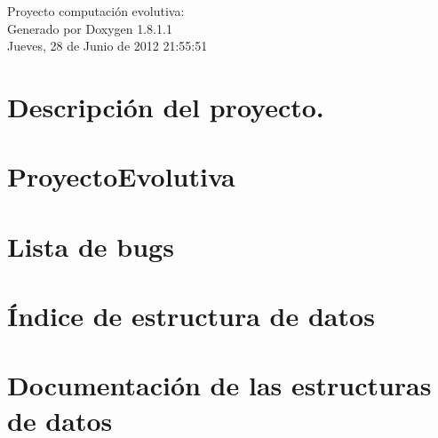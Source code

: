 \documentclass{book}
\begin{document}
\hypersetup{pageanchor=false,citecolor=blue}
\begin{titlepage}
\vspace*{7cm}
\begin{center}
{\Large Proyecto computación evolutiva\-: }\\
\vspace*{1cm}
{\large Generado por Doxygen 1.8.1.1}\\
\vspace*{0.5cm}
{\small Jueves, 28 de Junio de 2012 21:55:51}\\
\end{center}
\end{titlepage}
\clearemptydoublepage
{}
\tableofcontents
\clearemptydoublepage
{}
\hypersetup{pageanchor=true,citecolor=blue}
\chapter{Descripción del proyecto.}
\label{index}\hypertarget{index}{}
\chapter{Proyecto\-Evolutiva}
\label{md_README}
\hypertarget{md_README}{}

\chapter{Lista de bugs}
\label{bug}
\hypertarget{bug}{}

\chapter{Índice de estructura de datos}

\chapter{Documentación de las estructuras de datos}








\printindex
\end{document}

